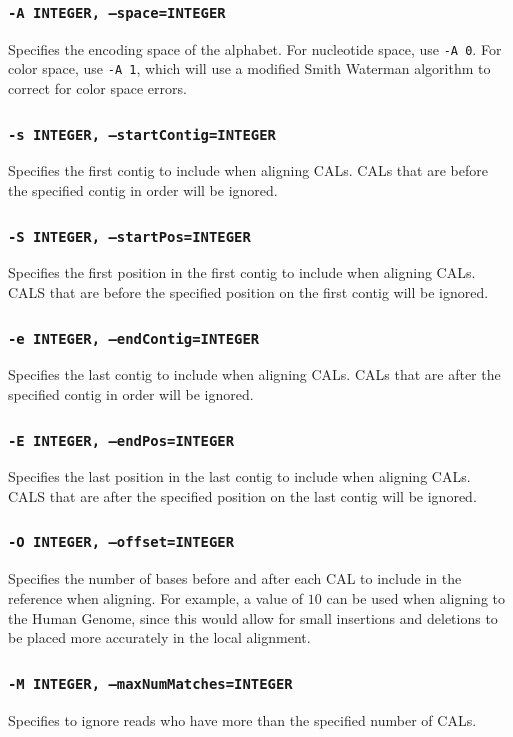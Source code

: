 \documentclass[a4paper,12pt]{book}
\newcommand{\TT}[1]{{\tt #1}} %
\begin{document}
\subsubsection{\TT{-A INTEGER, --space=INTEGER}}
Specifies the encoding space of the alphabet.
For nucleotide space, use \TT{-A 0}.
For color space, use \TT{-A 1}, which will use a modified Smith Waterman algorithm to correct for color space errors.

\subsubsection{\TT{-s INTEGER, --startContig=INTEGER}}
Specifies the first contig to include when aligning CALs.
CALs that are before the specified contig in order will be ignored.

\subsubsection{\TT{-S INTEGER, --startPos=INTEGER}}
Specifies the first position in the first contig to include when aligning CALs.
CALS that are before the specified position on the first contig will be ignored.

\subsubsection{\TT{-e INTEGER, --endContig=INTEGER}}
Specifies the last contig to include when aligning CALs.
CALs that are after the specified contig in order will be ignored.

\subsubsection{\TT{-E INTEGER, --endPos=INTEGER}}
Specifies the last position in the last contig to include when aligning CALs.
CALS that are after the specified position on the last contig will be ignored.

\subsubsection{\TT{-O INTEGER, --offset=INTEGER}}
Specifies the number of bases before and after each CAL to include in the reference when aligning.
For example, a value of $10$ can be used when aligning to the Human Genome, since this would allow for small insertions and deletions to be placed more accurately in the local alignment.

\subsubsection{\TT{-M INTEGER, --maxNumMatches=INTEGER}}
Specifies to ignore reads who have more than the specified number of CALs.
\end{document}
